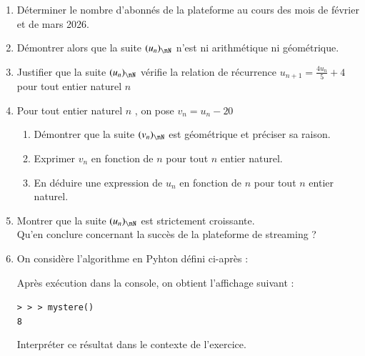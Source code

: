 \documentclass[oneside,12pt]{article}
\begin{document}
\begin{enumerate}
	\item Déterminer le nombre d'abonnés de la plateforme au cours des mois de février et de mars 2026.
	\item Démontrer alors que la suite $(u_n)_{\nN}$ n'est ni arithmétique ni géométrique.
	\item Justifier que la suite $(u_n)_{\nN}$ vérifie la relation de récurrence $u_{n+1}=\frac{4u_n}{5}+4$ \quad pour tout entier naturel $n$
	\item Pour tout entier naturel $n$ , on pose $v_n=u_n-20$
	\begin{enumerate}
		\item Démontrer que la suite $(v_n)_{\nN}$ est géométrique et préciser sa raison.
		\item Exprimer $v_n$ en fonction de $n$ pour tout $n$ entier naturel.
		\item En déduire une expression de $u_n$ en fonction de $n$ pour tout $n$ entier naturel.
	\end{enumerate}
	\item Montrer que la suite $(u_n)_{\nN}$ est strictement croissante.\\
	Qu'en conclure concernant la succès de la plateforme de streaming ?
	\item On considère l'algorithme en Pyhton défini ci-après :
	
    \begin{center}
    \end{center}
    
    Après exécution dans la console, on obtient l'affichage suivant :
    
    \begin{center}
        \begin{tcolorbox}[colframe=newred , colback = red!15 , arc=1pt , left=3pt , width = 5cm]
        	\texttt{>\,>\,> mystere()} \\
        	\texttt{8}
        \end{tcolorbox}
    \end{center}
    
    Interpréter ce résultat dans le contexte de l'exercice.
\end{enumerate}
\end{document}
